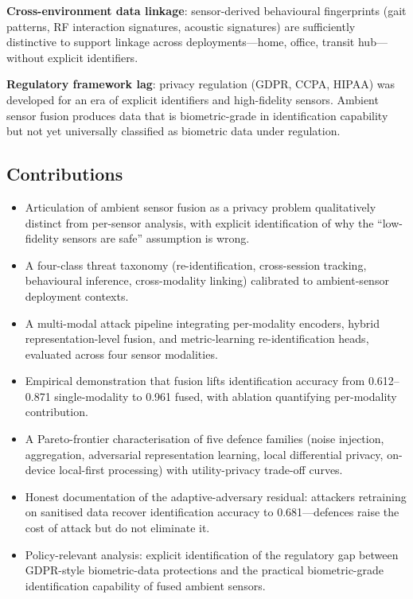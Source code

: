 \documentclass[sigconf,nonacm]{acmart}
\begin{document}
\textbf{Cross-environment data linkage}: sensor-derived behavioural
fingerprints (gait patterns, RF interaction signatures,
acoustic signatures) are sufficiently distinctive to support
linkage across deployments---home, office, transit hub---without
explicit identifiers.

\textbf{Regulatory framework lag}: privacy regulation (GDPR, CCPA,
HIPAA) was developed for an era of explicit identifiers and
high-fidelity sensors. Ambient sensor fusion produces data that is
biometric-grade in identification capability but not yet
universally classified as biometric data under regulation.

\subsection{Contributions}

\begin{itemize}
  \item Articulation of ambient sensor fusion as a privacy
        problem qualitatively distinct from per-sensor analysis,
        with explicit identification of why the
        ``low-fidelity sensors are safe'' assumption is wrong.
  \item A four-class threat taxonomy
        (re-identification, cross-session tracking, behavioural
        inference, cross-modality linking) calibrated to
        ambient-sensor deployment contexts.
  \item A multi-modal attack pipeline integrating per-modality
        encoders, hybrid representation-level fusion, and
        metric-learning re-identification heads, evaluated across
        four sensor modalities.
  \item Empirical demonstration that fusion lifts identification
        accuracy from 0.612--0.871 single-modality to 0.961 fused,
        with ablation quantifying per-modality contribution.
  \item A Pareto-frontier characterisation of five defence
        families (noise injection, aggregation,
        adversarial representation learning, local differential
        privacy, on-device local-first processing) with
        utility-privacy trade-off curves.
  \item Honest documentation of the adaptive-adversary
        residual: attackers retraining on sanitised data
        recover identification accuracy to 0.681---defences raise
        the cost of attack but do not eliminate it.
  \item Policy-relevant analysis: explicit identification of the
        regulatory gap between GDPR-style biometric-data
        protections and the practical biometric-grade
        identification capability of fused ambient sensors.
\end{itemize}
\end{document}
